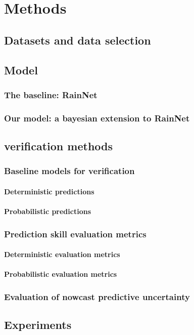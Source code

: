 \chapter{Methods}
\label{chapter:methods}


\section{Datasets and data selection}

\section{Model}

\subsection{The baseline: RainNet}
\subsection{Our model: a bayesian extension to RainNet}

\section{verification methods}

\subsection{Baseline models for verification}
\subsubsection{Deterministic predictions}
\subsubsection{Probabilistic predictions}
\subsection{Prediction skill evaluation metrics}
\subsubsection{Deterministic evaluation metrics}
\subsubsection{Probabilistic evaluation metrics}

\subsection{Evaluation of nowcast predictive uncertainty}


\section{Experiments}